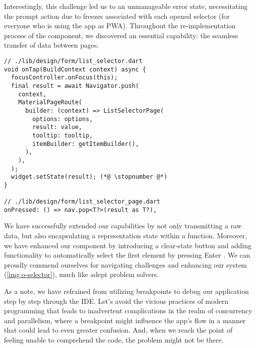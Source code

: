 Interestingly, this challenge led us to an unmanageable error state, necessitating the prompt action due to freezes 
associated with each opened selector (for everyone who is using the app as PWA). Throughout the re-implementation 
process of the component, we discovered an essential capability: the seamless transfer of data between pages.

\begin{lstlisting}
// ./lib/design/form/list_selector.dart
void onTap(BuildContext context) async {
  focusController.onFocus(this);
  final result = await Navigator.push(
    context,
    MaterialPageRoute(
      builder: (context) => ListSelectorPage(
        options: options,
        result: value,
        tooltip: tooltip,
        itemBuilder: getItemBuilder(),
      ),
    ),
  );
  widget.setState(result); (*@ \stopnumber @*)
}

// ./lib/design/form/list_selector_page.dart
onPressed: () => nav.pop<T?>(result as T?),
\end{lstlisting}

\noindent We have successfully extended our capabilities by not only transmitting a raw data, but also encapsulating a 
representation state within a function. Moreover, we have enhanced our component by introducing a clear-state button 
and adding functionality to automatically select the first element by pressing Enter . We can proudly 
commend ourselves for navigating challenges and enhancing our system (\cref{img:o-selector}), much like adept problem 
solvers.


\noindent As a note, we have refrained from utilizing breakpoints to debug our application step by step through the IDE. 
Let's avoid the vicious practices of modern programming that leads to inadvertent complications in the realm of 
concurrency and parallelism, where a breakpoint might influence the app's flow in a manner that could lead to even 
greater confusion. And, when we reach the point of feeling unable to comprehend the code, the problem might not be 
there.
